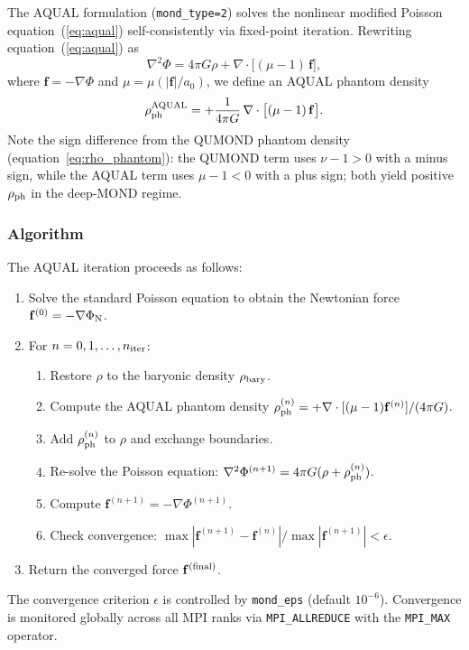 \documentclass[fleqn,usenatbib]{mnras}
\newcommand{\code}[1]{\texttt{#1}}
\newcommand{\azero}{a_0}
\newcommand{\rhoph}{\rho_{\rm ph}}
\begin{document}
The AQUAL formulation (\code{mond\_type=2}) solves the nonlinear
modified Poisson equation~(\ref{eq:aqual}) self-consistently via
fixed-point iteration.  Rewriting equation~(\ref{eq:aqual}) as
\begin{equation}
\nabla^2 \Phi = 4\pi G\rho + \nabla\cdot\bigl[(\mu - 1)\,\mathbf{f}\bigr],
\label{eq:aqual_split}
\end{equation}
where $\mathbf{f} = -\nabla\Phi$ and $\mu = \mu(|\mathbf{f}|/\azero)$,
we define an AQUAL phantom density
\begin{equation}
\rhoph^{\rm AQUAL} = +\frac{1}{4\pi G}\,\nabla\cdot\bigl[(\mu - 1)
\,\mathbf{f}\bigr].
\label{eq:rho_phantom_aqual}
\end{equation}
Note the sign difference from the QUMOND phantom density
(equation~\ref{eq:rho_phantom}): the QUMOND term uses $\nu - 1 > 0$
with a minus sign, while the AQUAL term uses $\mu - 1 < 0$ with a
plus sign; both yield positive $\rhoph$ in the deep-MOND regime.

\subsubsection{Algorithm}

The AQUAL iteration proceeds as follows:
\begin{enumerate}
\item Solve the standard Poisson equation to obtain the Newtonian force
  $\mathbf{f}^{(0)} = -\nabla\Phi_{\rm N}$.
\item For $n = 0, 1, \ldots, n_{\rm iter}$:
  \begin{enumerate}
  \item Restore $\rho$ to the baryonic density $\rho_{\rm bary}$.
  \item Compute the AQUAL phantom density
    $\rhoph^{(n)} = +\nabla\cdot[(\mu-1)\mathbf{f}^{(n)}]/(4\pi G)$.
  \item Add $\rhoph^{(n)}$ to $\rho$ and exchange boundaries.
  \item Re-solve the Poisson equation:
    $\nabla^2\Phi^{(n+1)} = 4\pi G(\rho + \rhoph^{(n)})$.
  \item Compute $\mathbf{f}^{(n+1)} = -\nabla\Phi^{(n+1)}$.
  \item Check convergence:
    $\max|\mathbf{f}^{(n+1)} - \mathbf{f}^{(n)}| /
    \max|\mathbf{f}^{(n+1)}| < \epsilon$.
  \end{enumerate}
\item Return the converged force $\mathbf{f}^{(\rm final)}$.
\end{enumerate}
The convergence criterion $\epsilon$ is controlled by
\code{mond\_eps} (default $10^{-6}$).  Convergence is monitored
globally across all MPI ranks via \code{MPI\_ALLREDUCE} with
the \code{MPI\_MAX} operator.
\end{document}
